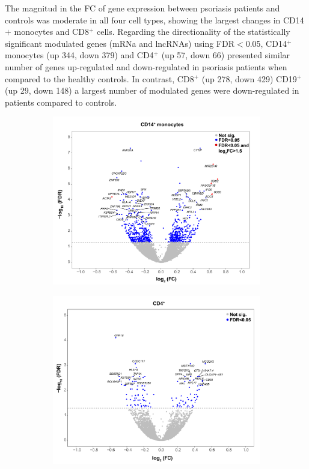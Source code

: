 The magnitud in the FC of gene expression between psoriasis patients and controls was moderate in all four cell types, showing the largest changes in CD14$+$ monocytes and CD8$^+$ cells. Regarding the directionality of the statistically significant modulated genes (mRNa and lncRNAs) using FDR$<$0.05, CD14$^+$ monocytes (up 344, down 379) and CD4$^+$ (up 57, down 66) presented  similar number of genes up-regulated and down-regulated in psoriasis patients when compared to the healthy controls. In contrast, CD8$^+$ (up 278, down 429) CD19$^+$ (up 29, down 148) a largest number of modulated genes were down-regulated in patients compared to controls.



\begin{figure}[htbp]
\centering
\begin{subfigure}{0.5\textwidth}
\centering
\includegraphics[width=\textwidth]{./Results2/pdfs/RNA_PS_CTL_CD14_volcano_plot}
\caption{\textbf{}}
\end{subfigure}%
\begin{subfigure}{0.5\textwidth}
\centering
\includegraphics[width=\textwidth]{./Results2/pdfs/RNA_PS_CTL_CD4_volcano_plot}

\end{subfigure}
\end{figure}
